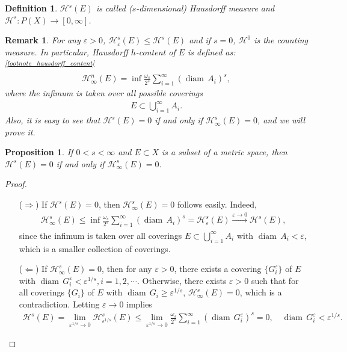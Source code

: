\documentclass[11pt]{book}
\newtheorem{definition}{Definition}[chapter]
\newtheorem{proposition}{Proposition}[chapter]
\newtheorem{remark}{Remark}[chapter]
\theoremstyle{definition}
\numberwithin{equation}{chapter}
\def\H{{\mathcal H}}
\def\diam{{\operatorname{diam}\,}}
\begin{document}
\begin{definition}
$\mathcal{H}^s(E)$ is called ($s$-dimensional) Hausdorff measure and $\mathcal{H}^s: P(X) \to [0,\infty]$.
\end{definition}

\medskip

\begin{remark}
For any $\varepsilon > 0$, $\mathcal{H}^s_{\varepsilon}(E) \leq \mathcal{H}^s(E)$ and if $s = 0$, $\mathcal{H}^0$ is the counting measure. In particular, Hausdorff $h$-content of $E$ is defined as:\textsuperscript{{\rm \ref{footnote_hausdorff_content}}}
\begin{align*}
    \mathcal{H}^n_{\infty}(E) = \inf \frac{\omega_s}{2^s} \sum^\infty_{i=1} \left(\diam A_i\right)^s,
\end{align*}
where the infimum is taken over all possible coverings
\begin{align*}
    E \subset \bigcup^\infty_{i=1} A_i.
\end{align*}
Also, it is easy to see that $\mathcal{H}^s(E) = 0$ if and only if $\mathcal{H}_\infty^s(E) = 0$, and we will prove it.
\end{remark}

\medskip

\begin{proposition}
If $0 < s < \infty$ and $E \subset X$ is a subset of a metric space, then $\mathcal{H}^s(E) = 0$ if and only if $\mathcal{H}_\infty^s(E) = 0$.
\end{proposition}
\begin{proof}\cite{11}
~\begin{enumerate}
    \item[($\Rightarrow$)] If $\H^s(E) = 0$, then  $\H^s_\infty(E) = 0$ follows easily. Indeed, \begin{align*}
        \H^s_\infty(E) \leq \inf \frac{\omega_s}{2^s} \sum_{i=1}^\infty (\diam A_i)^s = \H^s_\varepsilon(E) \xrightarrow[]{\varepsilon \to 0} \H^s(E),
    \end{align*}  
    since the infimum is taken over all coverings $E \subset \bigcup^\infty_{i=1} A_i$ with $\diam A_i < \varepsilon$, which is a smaller collection of coverings.
    
    \item[($\Leftarrow$)] If $\H^s_\infty(E) = 0$, then for any $\varepsilon > 0$, there exists a covering $\{G^\varepsilon_i\}$ of $E$ with $\diam G^\varepsilon_i < \varepsilon^{1/s}, i = 1,2,\cdots$. Otherwise, there exists $\varepsilon > 0$ such that for all coverings $\{G_i\}$ of $E$ with $\diam G_i \geq \varepsilon^{1/s}$, $\H^s_\infty(E) = 0$, which is a contradiction. Letting $\varepsilon \to 0$ implies
    \begin{align*}
        \H^s(E) = \lim_{\varepsilon^{1/s} \to 0}\H^s_{\varepsilon^{1/s}}(E) \leq \lim_{\varepsilon^{1/s} \to 0} \frac{\omega_s}{2^s} \sum^\infty_{i=1} (\diam G^\varepsilon_i)^s = 0, \quad \diam G^\varepsilon_i < \varepsilon^{1/s}.
    \end{align*}
\end{enumerate}
\end{proof}
\end{document}
